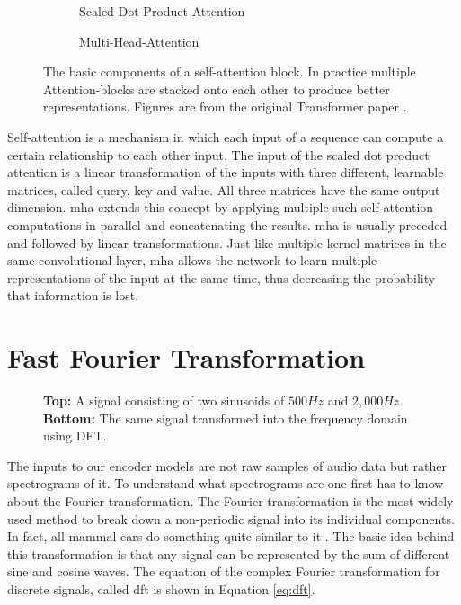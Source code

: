 \begin{figure}[h!]
  \centering
  \begin{subfigure}[b]{0.49\linewidth}
    \centering
    \scalebox{1.0}{}
    \caption{Scaled Dot-Product Attention}
  \end{subfigure}
  \begin{subfigure}[b]{0.49\linewidth}
    \centering
    \scalebox{1.0}{}
    \caption{Multi-Head-Attention}
  \end{subfigure}
  \caption[Scaled Dot-Product Attention and Multi-Head-Attention]{The basic components of a self-attention block. In practice multiple Attention-blocks are stacked onto each other to produce better representations. Figures are from the original Transformer paper \cite{NIPS2017_7181}.}
  \label{fig:attention_mha}
\end{figure}

Self-attention is a mechanism in which each input of a sequence can compute a certain relationship to each other input. The input of the scaled dot product attention is a linear transformation of the inputs with three different, learnable matrices, called query, key and value. All three matrices have the same output dimension. \gls{mha} extends this concept by applying multiple such self-attention computations in parallel and concatenating the results. \gls{mha} is usually preceded and followed by linear transformations. Just like multiple kernel matrices in the same convolutional layer, \gls{mha} allows the network to learn multiple representations of the input at the same time, thus decreasing the probability that information is lost.

\section{Fast Fourier Transformation}\label{sec:fft}

\begin{figure}[t]
    \centering
    
    \caption[Discrete Fourier Transform]{\textbf{Top:} A signal consisting of two sinusoids of $500Hz$ and $2,000Hz$. \textbf{Bottom:} The same signal transformed into the frequency domain using DFT.}
    \label{fig:dft}
\end{figure}

The inputs to our encoder models are not raw samples of audio data but rather spectrograms of it. To understand what spectrograms are one first has to know about the Fourier transformation. The Fourier transformation is the most widely used method to break down a non-periodic signal into its individual components. In fact, all mammal ears do something quite similar to it \cite{smith1997dsp}. The basic idea behind this transformation is that any signal can be represented by the sum of different sine and cosine waves. The equation of the complex Fourier transformation for discrete signals, called \gls{dft} is shown in Equation \ref{eq:dft}.

